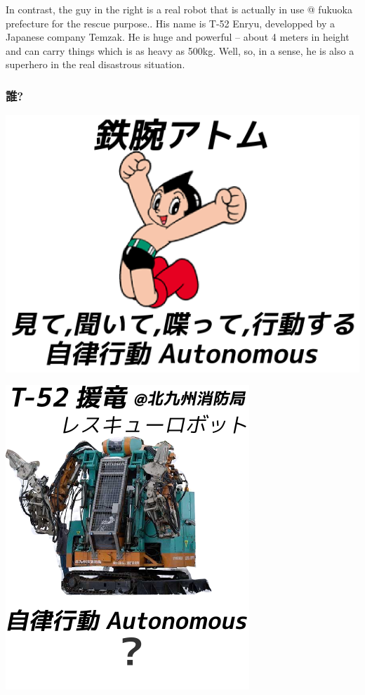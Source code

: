 \begin{resume}
In contrast, the guy in the right is a real robot that is actually in use @ fukuoka prefecture for the rescue purpose..
His name is T-52 Enryu, developped by a Japanese company Temzak.
He is huge and powerful -- about 4 meters in height and can carry things which is as heavy as 500kg.
Well, so, in a sense, he is also a superhero in the real disastrous situation.
\end{resume}

\subsubsection{誰?}
\label{sec-4-1-4}

\begin{container-fluid}
\begin{row-fluid}
\begin{span6}
\includegraphics{img/astro/final.png}
\end{span6}
\begin{span6}
\includegraphics{img/rescue/3.png}
\end{span6}
\end{row-fluid}
\end{container-fluid}

